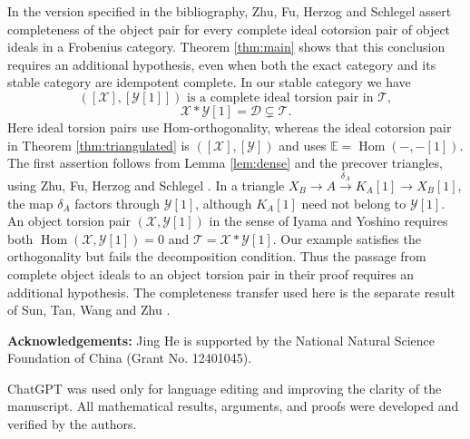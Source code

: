 \documentclass[11pt,a4paper,reqno]{amsart}
\newcommand{\Dcal}{\mathcal D}
\newcommand{\Tcal}{\mathcal T}
\newcommand{\Xcal}{\mathcal X}
\newcommand{\Hom}{\operatorname{Hom}}
\theoremstyle{plain}
\theoremstyle{definition}
\theoremstyle{remark}
\newcommand{\Ycal}{\mathcal Y}
\begin{document}
In the version specified in the bibliography, Zhu, Fu, Herzog and Schlegel \cite[Corollary~56]{ZFHS25} assert completeness of the object pair for every complete ideal cotorsion pair of object ideals in a Frobenius category. Theorem \ref{thm:main} shows that this conclusion requires an additional hypothesis, even when both the exact category and its stable category are idempotent complete. In our stable category we have
$$
([\Xcal],[\Ycal[1]])\text{ is a complete ideal torsion pair in }\Tcal,
$$
$$
\Xcal*\Ycal[1]=\Dcal\subsetneq\Tcal.
$$
Here ideal torsion pairs use Hom-orthogonality, whereas the ideal cotorsion pair in Theorem \ref{thm:triangulated} is $([\Xcal],[\Ycal])$ and uses $\mathbb E=\Hom(-,-[1])$. The first assertion follows from Lemma \ref{lem:dense} and the precover triangles, using Zhu, Fu, Herzog and Schlegel \cite[Example~23]{ZFHS25}. In a triangle $X_B\to A\xrightarrow{\delta_A}K_A[1]\to X_B[1]$, the map $\delta_A$ factors through $\Ycal[1]$, although $K_A[1]$ need not belong to $\Ycal[1]$. An object torsion pair $(\Xcal,\Ycal[1])$ in the sense of Iyama and Yoshino \cite[Definition~2.2]{IY08} requires both $\Hom(\Xcal,\Ycal[1])=0$ and $\Tcal=\Xcal*\Ycal[1]$. Our example satisfies the orthogonality but fails the decomposition condition. Thus the passage from complete object ideals to an object torsion pair in their proof requires an additional hypothesis. The completeness transfer used here is the separate result of Sun, Tan, Wang and Zhu \cite[Corollary~1.2]{STWZ25}.


\vspace{3mm}

\noindent\textbf{Acknowledgements:}
Jing He is supported by the National Natural
Science Foundation of China (Grant No. 12401045).

\vspace{3mm}

 ChatGPT was used only for language editing and improving the clarity of the manuscript. All mathematical results, arguments, and proofs were developed and verified by the authors.
\end{document}
